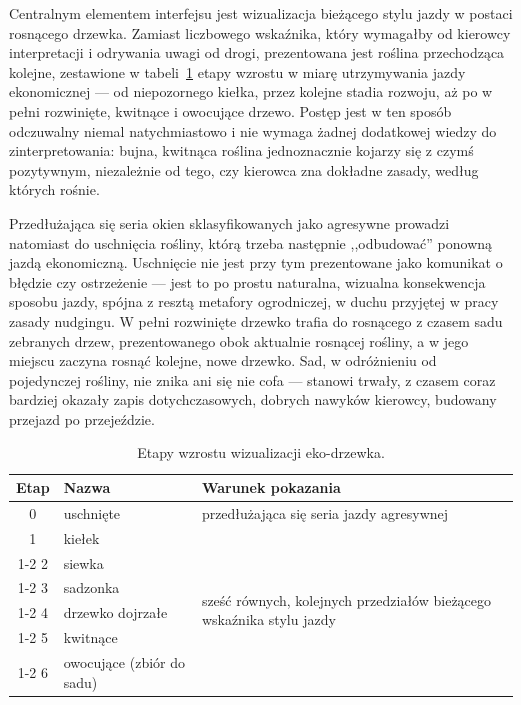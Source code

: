 Centralnym elementem interfejsu jest wizualizacja bieżącego stylu jazdy
w postaci rosnącego drzewka. Zamiast liczbowego wskaźnika, który wymagałby
od kierowcy interpretacji i odrywania uwagi od drogi, prezentowana jest
roślina przechodząca kolejne, zestawione w tabeli~\ref{tab:etapy-drzewka}
etapy wzrostu w miarę utrzymywania jazdy ekonomicznej --- od niepozornego
kiełka, przez kolejne stadia rozwoju, aż po w pełni rozwinięte, kwitnące
i owocujące drzewo. Postęp jest w ten sposób odczuwalny niemal
natychmiastowo i nie wymaga żadnej dodatkowej wiedzy do zinterpretowania:
bujna, kwitnąca roślina jednoznacznie kojarzy się z czymś pozytywnym,
niezależnie od tego, czy kierowca zna dokładne zasady, według których
rośnie.

Przedłużająca się seria okien sklasyfikowanych jako agresywne prowadzi
natomiast do uschnięcia rośliny, którą trzeba następnie
\mbox{,,odbudować''} ponowną jazdą ekonomiczną. Uschnięcie nie jest przy
tym prezentowane jako komunikat o błędzie czy ostrzeżenie --- jest to po
prostu naturalna, wizualna konsekwencja sposobu jazdy, spójna z resztą
metafory ogrodniczej, w duchu przyjętej w pracy zasady nudgingu. W pełni
rozwinięte drzewko trafia do rosnącego z czasem sadu zebranych drzew,
prezentowanego obok aktualnie rosnącej rośliny, a w jego miejscu zaczyna
rosnąć kolejne, nowe drzewko. Sad, w odróżnieniu od pojedynczej rośliny,
nie znika ani się nie cofa --- stanowi trwały, z czasem coraz bardziej
okazały zapis dotychczasowych, dobrych nawyków kierowcy, budowany
przejazd po przejeździe.

\begin{table}[!h]
    \centering
    \caption{Etapy wzrostu wizualizacji eko-drzewka.}
    \label{tab:etapy-drzewka}
    \begin{tabular}{| c | l | p{7.5cm} |} \hline
        \textbf{Etap} & \textbf{Nazwa} & \textbf{Warunek pokazania} \\ \hline\hline
        0 & uschnięte      & przedłużająca się seria jazdy agresywnej \\ \hline
        1 & kiełek         & \multirow{6}{7.5cm}{sześć równych, kolejnych przedziałów bieżącego wskaźnika stylu jazdy} \\ \cline{1-2}
        2 & siewka         &  \\ \cline{1-2}
        3 & sadzonka       &  \\ \cline{1-2}
        4 & drzewko dojrzałe &  \\ \cline{1-2}
        5 & kwitnące       &  \\ \cline{1-2}
        6 & owocujące (zbiór do sadu) &  \\ \hline
    \end{tabular}
\end{table}

